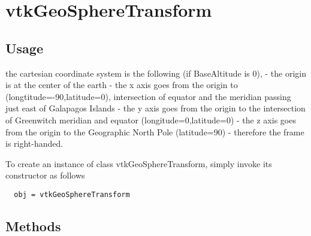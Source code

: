 \section{vtkGeoSphereTransform}

\subsection{Usage}

 the cartesian coordinate system is the following (if BaseAltitude is 0),
 - the origin is at the center of the earth
 - the x axis goes from the origin to (longtitude=-90,latitude=0), intersection of equator and the meridian passing just east of Galapagos Islands
 - the y axis goes from the origin to the intersection of Greenwitch meridian and equator (longitude=0,latitude=0)
 - the z axis goes from the origin to the Geographic North Pole (latitude=90)
 - therefore the frame is right-handed.

To create an instance of class vtkGeoSphereTransform, simply
invoke its constructor as follows
\begin{verbatim}
  obj = vtkGeoSphereTransform
\end{verbatim}
\subsection{Methods}

